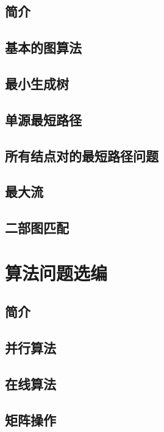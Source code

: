 \documentclass[lang=cn,newtx,10pt,scheme=chinese]{elegantbook}
\begin{document}
\chapter*{简介}

\chapter{基本的图算法}\label{chapter-20}

\chapter{最小生成树}\label{chapter-21}

\chapter{单源最短路径}\label{chapter-22}

\chapter{所有结点对的最短路径问题}\label{chapter-23}

\chapter{最大流}\label{chapter-24}

\chapter{二部图匹配}\label{chapter-25}

\part{算法问题选编}

\chapter*{简介}

\chapter{并行算法}\label{chapter-26}

\chapter{在线算法}\label{chapter-27}

\chapter{矩阵操作}\label{chapter-28}
\end{document}
